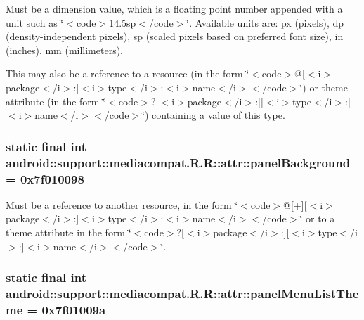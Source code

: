 Must be a dimension value, which is a floating point number appended with a unit such as \char`\"{}$<$code$>$14.5sp$<$/code$>$\char`\"{}. Available units are: px (pixels), dp (density-independent pixels), sp (scaled pixels based on preferred font size), in (inches), mm (millimeters). 

This may also be a reference to a resource (in the form \char`\"{}$<$code$>$@\mbox{[}$<$i$>$package$<$/i$>$:\mbox{]}$<$i$>$type$<$/i$>$:$<$i$>$name$<$/i$>$$<$/code$>$\char`\"{}) or theme attribute (in the form \char`\"{}$<$code$>$?\mbox{[}$<$i$>$package$<$/i$>$:\mbox{]}\mbox{[}$<$i$>$type$<$/i$>$:\mbox{]}$<$i$>$name$<$/i$>$$<$/code$>$\char`\"{}) containing a value of this type. \hypertarget{classandroid_1_1support_1_1mediacompat_1_1_r_1_1attr_913f034101e4a0cdf7cd66b3637c6337}{
\subsubsection[{panelBackground}]{\setlength{\rightskip}{0pt plus 5cm}static final int android::support::mediacompat.R.R::attr::panelBackground = 0x7f010098}}
\label{classandroid_1_1support_1_1mediacompat_1_1_r_1_1attr_913f034101e4a0cdf7cd66b3637c6337}


Must be a reference to another resource, in the form \char`\"{}$<$code$>$@\mbox{[}+\mbox{]}\mbox{[}$<$i$>$package$<$/i$>$:\mbox{]}$<$i$>$type$<$/i$>$:$<$i$>$name$<$/i$>$$<$/code$>$\char`\"{} or to a theme attribute in the form \char`\"{}$<$code$>$?\mbox{[}$<$i$>$package$<$/i$>$:\mbox{]}\mbox{[}$<$i$>$type$<$/i$>$:\mbox{]}$<$i$>$name$<$/i$>$$<$/code$>$\char`\"{}. \hypertarget{classandroid_1_1support_1_1mediacompat_1_1_r_1_1attr_40838b8e94fe54ea3918d3e1b468fb9a}{
\subsubsection[{panelMenuListTheme}]{\setlength{\rightskip}{0pt plus 5cm}static final int android::support::mediacompat.R.R::attr::panelMenuListTheme = 0x7f01009a}}
\label{classandroid_1_1support_1_1mediacompat_1_1_r_1_1attr_40838b8e94fe54ea3918d3e1b468fb9a}


